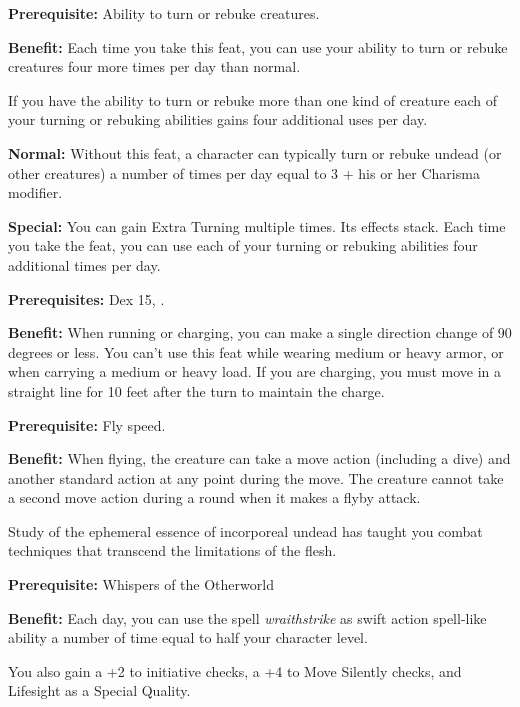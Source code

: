 
\textbf{Prerequisite:} Ability to turn or rebuke creatures.

\textbf{Benefit:} Each time you take this feat, you can use your ability to turn or rebuke creatures four more times per day than normal.

If you have the ability to turn or rebuke more than one kind of creature each of your turning or rebuking abilities gains four additional uses per day.

\textbf{Normal:} Without this feat, a character can typically turn or rebuke undead (or other creatures) a number of times per day equal to 3 + his or her Charisma modifier.

\textbf{Special:} You can gain Extra Turning multiple times. Its effects stack. Each time you take the feat, you can use each of your turning or rebuking abilities four additional times per day.


\textbf{Prerequisites:} Dex 15, .

\textbf{Benefit:} When running or charging, you can make a single direction change of 90 degrees or less. You can't use this feat while wearing medium or heavy armor, or when carrying a medium or heavy load.  If you are charging, you must move in a straight line for 10 feet after the turn to maintain the charge.


\textbf{Prerequisite:} Fly speed.

\textbf{Benefit:} When flying, the creature can take a move action (including a dive) and another standard action at any point during the move. The creature cannot take a second move action during a round when it makes a flyby attack.


Study of the ephemeral essence of incorporeal undead has taught you combat techniques that transcend the limitations of the flesh.

\textbf{Prerequisite:} Whispers of the Otherworld

\textbf{Benefit:} Each day, you can use the spell \textit{wraithstrike} as swift action spell-like ability a number of time equal to half your character level.

You also gain a +2 to initiative checks, a +4 to Move Silently checks, and Lifesight as a Special Quality.

